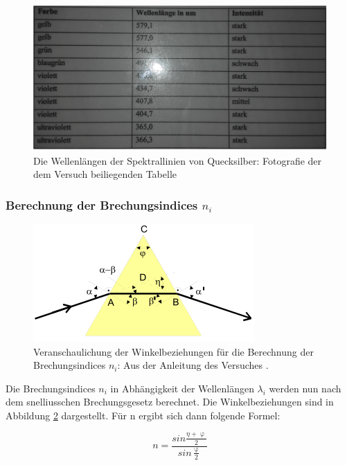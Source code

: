 \begin{figure}
  \centering
  \includegraphics[scale=0.1]{images/Tabelle.png}
  \caption{Die Wellenlängen der Spektrallinien von Quecksilber: Fotografie der dem Versuch beiliegenden Tabelle}
  \label{fig:Etatabelle}
\end{figure}

\subsubsection{Berechnung der Brechungsindices $n_i$}

\begin{figure}
  \centering
  \includegraphics[scale=0.6]{images/Brechungsindex.png}
  \caption{Veranschaulichung der Winkelbeziehungen für die Berechnung der Brechungsindices $n_i$: Aus der Anleitung des Versuches \cite[23]{1}.}
  \label{fig:Brechungsindex}
\end{figure}

Die Brechungsindices $n_i$ in Abhängigkeit der Wellenlängen $\lambda_i$ werden nun nach dem snelliusschen Brechungsgesetz berechnet.
Die Winkelbeziehungen sind in Abbildung \ref{fig:Brechungsindex} dargestellt.
Für n ergibt sich dann folgende Formel:

\begin{equation}
  n = \frac{sin\frac{\eta + \upvarphi}{2}}{sin\frac{\upvarphi}{2}}
\end{equation}

